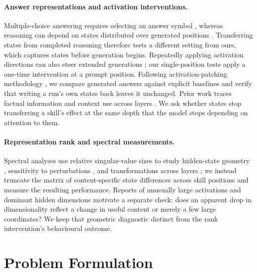 \documentclass{article}
\begin{document}
\paragraph{Answer representations and activation interventions.}
Multiple-choice answering requires selecting an answer symbol
\citep{wiegreffe2025mcq}, whereas reasoning can depend on states distributed
over generated positions \citep{dura2026sequentialpatching}. Transferring states
from completed reasoning \citep{mehrafarin2026cothidden} therefore tests a
different setting from ours, which captures states before generation begins.
Repeatedly applying activation directions can also steer extended generations
\citep{panickssery2024caa, liu2024icv, stolfo2025instruction}; our
single-position tests apply a one-time intervention at a prompt position.
Following activation-patching methodology \citep{zhang2023bestpractices,
heimersheim2024patching}, we compare generated answers against explicit
baselines and verify that writing a run's own states back leaves it unchanged.
Prior work traces factual information and context use across layers
\citep{meng2022rome, geva2023dissecting, sia2024incontexttranslation,
onset2025instruction}. We ask whether states stop transferring a skill's effect
at the same depth that the model stops depending on attention to them.

\paragraph{Representation rank and spectral measurements.}
Spectral analyses use relative singular-value sizes to study hidden-state
geometry \citep{valeriani2023geometry}, sensitivity to perturbations
\citep{sarkar2026causaldim}, and transformations across layers
\citep{fernando2026residualspectral}; we instead truncate the matrix of
content-specific state differences across skill positions and measure the
resulting performance. Reports of unusually large activations
\citep{sun2024massive, shi2026melayer} and dominant hidden dimensions
\citep{timkey2021rogue, kovaleva2021bertbusters} motivate a separate check:
does an apparent drop in dimensionality reflect a change in useful content or
merely a few large coordinates? We keep that geometric diagnostic distinct from
the rank intervention's behavioural outcome.

\section{Problem Formulation}
\label{sec:formulation}
\end{document}
